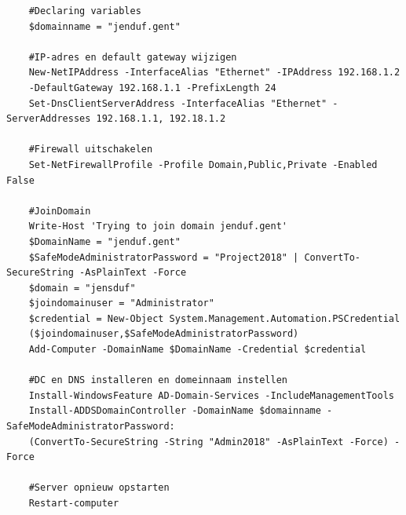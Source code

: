 \documentclass[a4paper]{article}
\begin{document}
\begin{verbatim}
	#Declaring variables
	$domainname = "jenduf.gent"
	
	#IP-adres en default gateway wijzigen
	New-NetIPAddress -InterfaceAlias "Ethernet" -IPAddress 192.168.1.2 
	-DefaultGateway 192.168.1.1 -PrefixLength 24
	Set-DnsClientServerAddress -InterfaceAlias "Ethernet" -ServerAddresses 192.168.1.1, 192.18.1.2
	
	#Firewall uitschakelen
	Set-NetFirewallProfile -Profile Domain,Public,Private -Enabled False
	
	#JoinDomain
	Write-Host 'Trying to join domain jenduf.gent'
	$DomainName = "jenduf.gent"
	$SafeModeAdministratorPassword = "Project2018" | ConvertTo-SecureString -AsPlainText -Force
	$domain = "jensduf"
	$joindomainuser = "Administrator"
	$credential = New-Object System.Management.Automation.PSCredential
	($joindomainuser,$SafeModeAdministratorPassword)
	Add-Computer -DomainName $DomainName -Credential $credential
	
	#DC en DNS installeren en domeinnaam instellen
	Install-WindowsFeature AD-Domain-Services -IncludeManagementTools
	Install-ADDSDomainController -DomainName $domainname -SafeModeAdministratorPassword:
	(ConvertTo-SecureString -String "Admin2018" -AsPlainText -Force) -Force
	
	#Server opnieuw opstarten
	Restart-computer
\end{verbatim}
\end{document}
